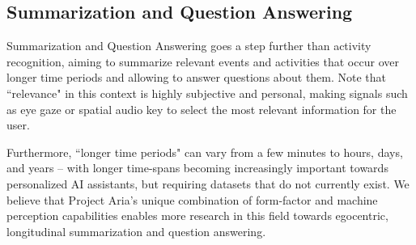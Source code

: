 \subsection{Summarization and Question Answering}
Summarization and Question Answering goes a step further than activity recognition, aiming to summarize relevant events and activities that occur over longer time periods and allowing to answer questions about them. Note that ``relevance" in this context is highly subjective and personal, making signals such as eye gaze or spatial audio key to select the most relevant information for the user. 

Furthermore, ``longer time periods" can vary from a few minutes to hours, days, and years -- with longer time-spans becoming increasingly important towards personalized AI assistants, but requiring datasets that do not currently exist. We believe that Project Aria's unique combination of form-factor and machine perception capabilities enables more research in this field towards egocentric, longitudinal summarization and question answering. 

%

